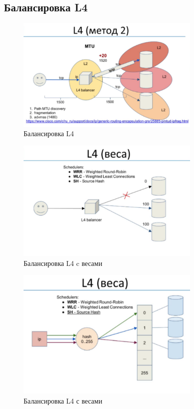 \subsection{Балансировка L4}

\begin{figure}[h!]
\centering
\includegraphics[width=0.8\textwidth]{img/L41.png}
\caption{Балансировка L4}
\label{L41}
\end{figure}


\begin{figure}[h!]
\centering
\includegraphics[width=0.8\textwidth]{img/L4-weights1.png}
\caption{Балансировка L4 c весами}
\label{L4w1}
\end{figure}


\begin{figure}[h!]
\centering
\includegraphics[width=0.8\textwidth]{img/L4-weights2.png}
\caption{Балансировка L4 с весами}
\label{L4w2}
\end{figure}

